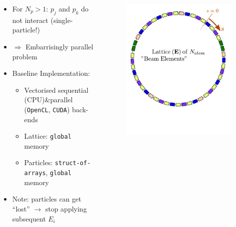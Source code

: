 \documentclass{beamer}
\begin{document}
\begin{frame}[t]
\begin{columns}
\begin{column}{0.6\textwidth}
\begin{itemize}
 \item<6-> For $N_p > 1$: $p_j$ and $p_k$ do not interact (single-particle!)
 \item<7-> $\Rightarrow$ {\color{MyDarkBlue}Embarrisingly parallel problem}
 \item<8-> {\color{MyDarkRed}Baseline Implementation:}
    \begin{itemize}
        \item<8->Vectorised sequential (CPU)\&\newline parallel (\texttt{OpenCL}, \texttt{CUDA}) back-ends
        \item<9->Lattice: \texttt{global} memory
        \item<9->Particles: \texttt{struct-of-arrays}, \texttt{global} memory
    \end{itemize}
 \item<3-> {\color{MyDarkBlue}Note:} particles can get ``{\color{MyDarkRed}lost}'' $\rightarrow$ stop applying subsequent $E_i$
\end{itemize}
\end{column}
\begin{column}{0.35\textwidth}
{
    \begin{figure}[H]
        \centering
        \includegraphics[width=\textwidth]{presentation_images/fig_tracking_algorithm_01}

\end{figure}}
\end{column}
\end{columns}
\end{frame}
\end{document}
